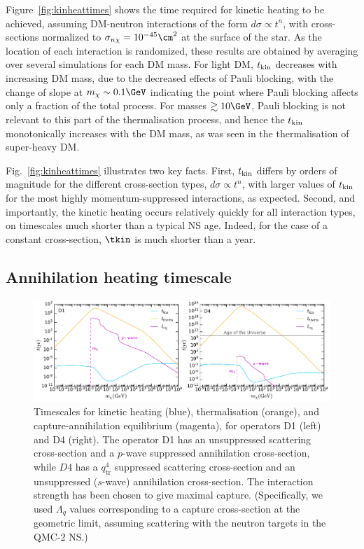 Figure~\ref{fig:kinheattimes} shows the time required for kinetic heating to be achieved, assuming DM-neutron interactions of the form $d\sigma \propto t^n$, with cross-sections normalized to $\sigma_{n\chi} = 10^{-45}\cm^2$ at the surface of the star. As the location of each interaction is randomized, these results are obtained by averaging over several simulations for each DM mass. For light DM, $t_{\rm kin}$ decreases with increasing DM mass, due to the decreased effects of Pauli blocking, with the change of slope at $m_\chi \sim 0.1\GeV$ indicating the point where Pauli blocking affects only a fraction of the total process.
For masses $\gtrsim 10\GeV$, Pauli blocking is not relevant to this part of the thermalisation process, and hence the $t_{\rm kin}$ monotonically increases with the DM mass, as was seen in the thermalisation of super-heavy DM. 

Fig.~\ref{fig:kinheattimes} illustrates two key facts. First, $t_{\rm kin}$ differs by orders of magnitude for the different cross-section types, $d\sigma\propto t^n$, with larger values of $t_{\rm kin}$ for the most highly momentum-suppressed interactions, as expected. Second, and importantly, the kinetic heating occurs relatively quickly for all interaction types, on timescales much shorter than a typical NS age. Indeed, for the case of a constant cross-section, $\tkin$ is much shorter than a year.



\subsection{Annihilation heating timescale}
\label{subsec:AnnHeatTimes}



\begin{figure}[t]
\centering    
\includegraphics[width=\textwidth]{timescales_maxcap_n.pdf}
    \caption{Timescales for kinetic heating (blue), thermalisation (orange), and capture-annihilation equilibrium (magenta), for operators D1 (left) and D4 (right). The operator D1 has an unsuppressed scattering cross-section and a $p$-wave suppressed annihilation cross-section, while $D4$ has a $q_\text{tr}^4$ suppressed scattering cross-section and an unsuppressed ($s$-wave) annihilation cross-section.
    The interaction strength has been chosen to give maximal capture. (Specifically, we used $\Lambda_q$ values corresponding to a capture cross-section at the geometric limit, assuming scattering with the neutron targets in the QMC-2 NS.)   
    }
    \label{fig:timescales}
\end{figure}




